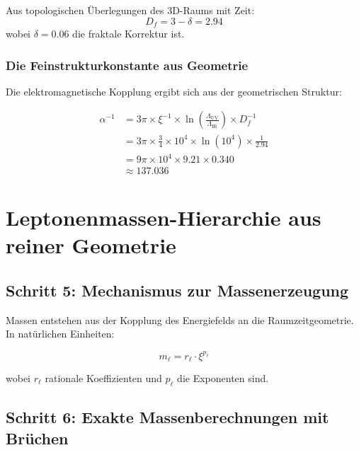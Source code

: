\documentclass[12pt,a4paper]{article}
\newcommand{\xipar}{\xi}
\begin{document}
	Aus topologischen Überlegungen des 3D-Raums mit Zeit:
	\begin{equation}
		D_f = 3 - \delta = 2.94
	\end{equation}
	wobei $\delta = 0.06$ die fraktale Korrektur ist.
	
	\subsubsection{Die Feinstrukturkonstante aus Geometrie}
	
	Die elektromagnetische Kopplung ergibt sich aus der geometrischen Struktur:
	
	\begin{keyresult}
		\begin{align}
			\alpha^{-1} &= 3\pi \times \xipar^{-1} \times \ln\left(\frac{\Lambda_{\text{UV}}}{\Lambda_{\text{IR}}}\right) \times D_f^{-1} \\
			&= 3\pi \times \frac{3}{4} \times 10^{4} \times \ln(10^{4}) \times \frac{1}{2.94} \\
			&= 9\pi \times 10^{4} \times 9.21 \times 0.340 \\
			&\approx 137.036
		\end{align}
	\end{keyresult}
	
	\section{Leptonenmassen-Hierarchie aus reiner Geometrie}
	
	\subsection{Schritt 5: Mechanismus zur Massenerzeugung}
	
	Massen entstehen aus der Kopplung des Energiefelds an die Raumzeitgeometrie. In natürlichen Einheiten:
	
	\begin{equation}
		m_{\ell} = r_{\ell} \cdot \xipar^{p_{\ell}}
	\end{equation}
	
	wobei $r_{\ell}$ rationale Koeffizienten und $p_{\ell}$ die Exponenten sind.
	
	\subsection{Schritt 6: Exakte Massenberechnungen mit Brüchen}
	
\end{document}
